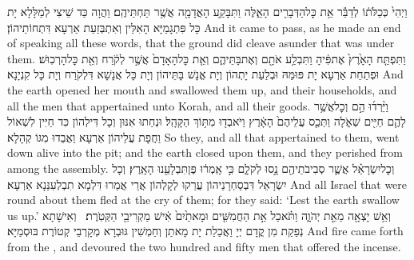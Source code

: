 {וַיְהִי֙ כְּכַלֹּת֔וֹ לְדַבֵּ֕ר אֵ֥ת כׇּל\maqqaf הַדְּבָרִ֖ים הָאֵ֑לֶּה וַתִּבָּקַ֥ע הָאֲדָמָ֖ה אֲשֶׁ֥ר תַּחְתֵּיהֶֽם׃}
{וַהֲוָה כַּד שֵׁיצִי לְמַלָּלָא יָת כָּל פִּתְגָמַיָּא הָאִלֵּין וְאִתְבְּזַעַת אַרְעָא דִּתְחוֹתֵיהוֹן׃}
{And it came to pass, as he made an end of speaking all these words, that the ground did cleave asunder that was under them.}{}
{וַתִּפְתַּ֤ח הָאָ֙רֶץ֙ אֶת\maqqaf פִּ֔יהָ וַתִּבְלַ֥ע אֹתָ֖ם וְאֶת\maqqaf בָּתֵּיהֶ֑ם וְאֵ֤ת כׇּל\maqqaf הָאָדָם֙ אֲשֶׁ֣ר לְקֹ֔רַח וְאֵ֖ת כׇּל\maqqaf הָרְכֽוּשׁ׃}
{וּפְתַחַת אַרְעָא יָת פּוּמַּהּ וּבְלַעַת יָתְהוֹן וְיָת אֱנָשׁ בָּתֵּיהוֹן וְיָת כָּל אֲנָשָׁא דִּלְקֹרַח וְיָת כָּל קִנְיָנָא׃}
{And the earth opened her mouth and swallowed them up, and their households, and all the men that appertained unto Korah, and all their goods.}{}
{וַיֵּ֨רְד֜וּ הֵ֣ם וְכׇל\maqqaf אֲשֶׁ֥ר לָהֶ֛ם חַיִּ֖ים שְׁאֹ֑לָה וַתְּכַ֤ס עֲלֵיהֶם֙ הָאָ֔רֶץ וַיֹּאבְד֖וּ מִתּ֥וֹךְ הַקָּהָֽל׃}
{וּנְחַתוּ אִנּוּן וְכָל דִּילְהוֹן כִּד חַיִּין לִשְׁאוֹל וַחֲפָת עֲלֵיהוֹן אַרְעָא וַאֲבַדוּ מִגּוֹ קְהָלָא׃}
{So they, and all that appertained to them, went down alive into the pit; and the earth closed upon them, and they perished from among the assembly.}{}
{וְכׇל\maqqaf יִשְׂרָאֵ֗ל אֲשֶׁ֛ר סְבִיבֹתֵיהֶ֖ם נָ֣סוּ לְקֹלָ֑ם כִּ֣י אָֽמְר֔וּ פֶּן\maqqaf תִּבְלָעֵ֖נוּ הָאָֽרֶץ׃}
{וְכָל יִשְׂרָאֵל דִּבְסַחְרָנֵיהוֹן עֲרַקוּ לְקָלְהוֹן אֲרֵי אֲמַרוּ דִּלְמָא תִבְלְעִנַּנָא אַרְעָא׃}
{And all Israel that were round about them fled at the cry of them; for they said: ‘Lest the earth swallow us up.’}{}
{וְאֵ֥שׁ יָצְאָ֖ה מֵאֵ֣ת יְהֹוָ֑ה וַתֹּ֗אכַל אֵ֣ת הַחֲמִשִּׁ֤ים וּמָאתַ֙יִם֙ אִ֔ישׁ מַקְרִיבֵ֖י הַקְּטֹֽרֶת׃ \setuma }
{וְאִישָׁתָא נְפַקַת מִן קֳדָם יְיָ וַאֲכַלַת יָת מָאתַן וְחַמְשִׁין גּוּבְרָא מְקָרְבֵי קְטוֹרֶת בּוּסְמַיָּא׃}
{And fire came forth from the \lord, and devoured the two hundred and fifty men that offered the incense.}{}

